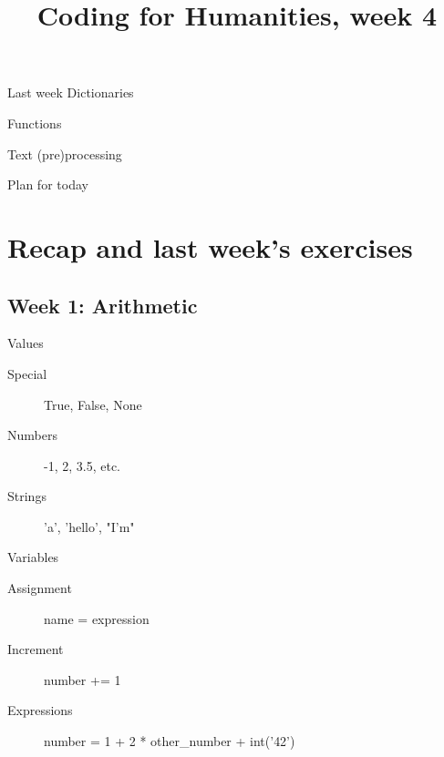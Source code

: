 \documentclass[aspectratio=169,usenames,dvipsnames]{beamer}
\title{Coding for Humanities, week 4}
\begin{document}
\begin{frame}
 \titlepage
\end{frame}

\begin{frame}{Last week}
    Dictionaries

    Functions

    Text (pre)processing
\end{frame}

\begin{frame}{Plan for today}
 \tableofcontents
\end{frame}

\section{Recap and last week's exercises}
\frame{\tableofcontents[currentsection]}

\subsection{Week 1: Arithmetic}
\begin{frame}[fragile]{Values}
    \begin{description}
        \item[Special] True, False, None
        \item[Numbers] -1, 2, 3.5, etc.
        \item[Strings] 'a', 'hello', "I'm"
    \end{description}
\end{frame}

\begin{frame}[fragile]{Variables}
    \begin{description}
        \item[Assignment] name = expression
        \item[Increment] number += 1
        \item[Expressions] number = 1 + 2 * other\_number + int('42')
    \end{description}
\end{frame}
\end{document}
